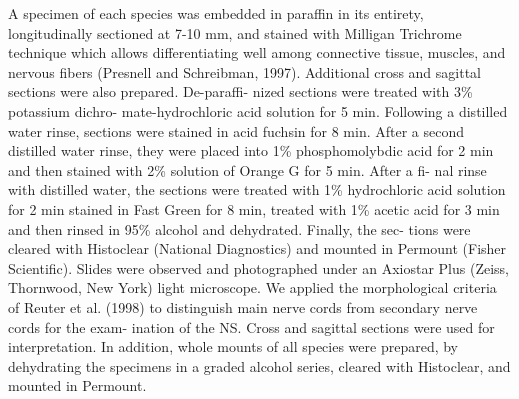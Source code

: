 \begin{multicols}{2}

\par{}A specimen of each species was embedded in paraffin
in its entirety, longitudinally sectioned at 7-10 mm, and
stained with Milligan Trichrome technique which allows
differentiating well among connective tissue, muscles, and
nervous fibers (Presnell and Schreibman, 1997). Additional
cross and sagittal sections were also prepared. De-paraffi-
nized sections were treated with 3\% potassium dichro-
mate-hydrochloric acid solution for 5 min. Following a
distilled water rinse, sections were stained in acid fuchsin
for 8 min. After a second distilled water rinse, they were
placed into 1\% phosphomolybdic acid for 2 min and then
stained with 2\% solution of Orange G for 5 min. After a fi-
nal rinse with distilled water, the sections were treated with
1\% hydrochloric acid solution for 2 min stained in Fast
Green for 8 min, treated with 1\% acetic acid for 3 min and
then rinsed in 95\% alcohol and dehydrated. Finally, the sec-
tions were cleared with Histoclear (National Diagnostics)
and mounted in Permount (Fisher Scientific). Slides were
observed and photographed under an Axiostar Plus (Zeiss,
Thornwood, New York) light microscope. We applied the
morphological criteria of Reuter et al. (1998) to distinguish
main nerve cords from secondary nerve cords for the exam-
ination of the NS. Cross and sagittal sections were used for
interpretation. In addition, whole mounts of all species
were prepared, by dehydrating the specimens in a graded
alcohol series, cleared with Histoclear, and mounted in
Permount.

\lipsum



\lipsum


\lipsum
\lipsum



\end{multicols}
